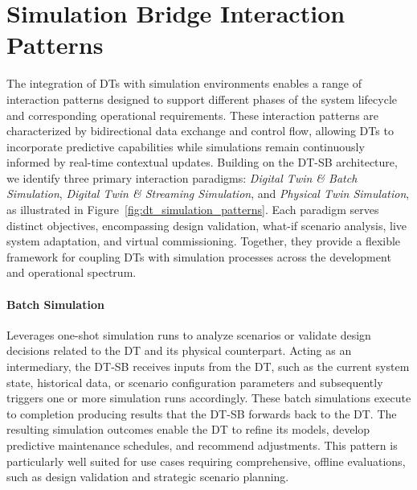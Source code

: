 \section{Simulation Bridge Interaction Patterns}
\label{sec:dt_sim_bridge}

The integration of DTs with simulation environments enables a range of interaction patterns designed to support different phases of the system lifecycle and corresponding operational requirements. These interaction patterns are characterized by bidirectional data exchange and control flow, allowing DTs to incorporate predictive capabilities while simulations remain continuously informed by real-time contextual updates.
Building on the DT-SB architecture, we identify three primary interaction paradigms: \emph{Digital Twin \& Batch Simulation}, \emph{Digital Twin \& Streaming Simulation}, and \emph{Physical Twin Simulation}, as illustrated in Figure~\ref{fig:dt_simulation_patterns}. Each paradigm serves distinct objectives, encompassing design validation, what-if scenario analysis, live system adaptation, and virtual commissioning.
Together, they provide a flexible framework for coupling DTs with simulation processes across the development and operational spectrum.


\paragraph{Batch Simulation}
\label{ssec:dt-batch-simulation}

Leverages one-shot simulation runs to analyze scenarios or validate design decisions related to the DT and its physical counterpart. Acting as an intermediary, the DT-SB receives inputs from the DT, such as the current system state, historical data, or scenario configuration parameters and subsequently triggers one or more simulation runs accordingly. These batch simulations execute to completion producing results that the DT-SB forwards back to the DT.
The resulting simulation outcomes enable the DT to refine its models, develop predictive maintenance schedules, and recommend adjustments. This pattern is particularly well suited for use cases requiring comprehensive, offline evaluations, such as design validation and strategic scenario planning.


